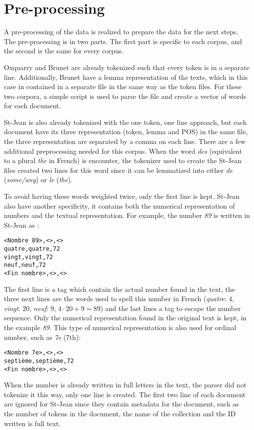 \section{Pre-processing}

A pre-processing of the data is realized to prepare the data for the next steps.
The pre-processing is in two parts.
The first part is specific to each corpus, and the second is the same for every corpus.

Oxquarry and Brunet are already tokenized such that every token is in a separate line.
Additionally, Brunet have a lemma representation of the texts, which in this case in contained in a separate file in the same way as the token files.
For these two corpora, a simple script is used to parse the file and create a vector of words for each document.

St-Jean is also already tokenized with the one token, one line approach, but each document have its three representation (token, lemma and POS) in the same file, the three representation are separated by a comma on each line.
There are a few additional preprocessing needed for this corpus.
When the word \textit{des} (equivalent to a plural \textit{the} in French) is encounter, the tokenizer used to create the St-Jean files created two lines for this word since it can be lemmatized into either \textit{de} (\textit{some/any}) or \textit{le} (\textit{the}).

To avoid having these words weighted twice, only the first line is kept.
St-Jean also have another specificity, it contains both the numerical representation of numbers and the textual representation.
For example, the number \textit{89} is written in St-Jean as :
\begin{verbatim}
<Nombre 89>,<>,<>
quatre,quatre,72
vingt,vingt,72
neuf,neuf,72
<Fin nombre>,<>,<>
\end{verbatim}
The first line is a tag which contain the actual number found in the text, the three next lines are the words used to spell this number in French (\textit{quatre}: $4$, \textit{vingt}: $20$, \textit{neuf}: $9$, $4 \cdot 20 + 9 = 89$) and the last lines a tag to escape the number sequence.
Only the numerical representation found in the original text is kept, in the example \textit{89}.
This type of numerical representation is also used for ordinal number, such as \textit{7e} (7th):
\begin{verbatim}
<Nombre 7e>,<>,<>
septième,septième,72
<Fin nombre>,<>,<>
\end{verbatim}
When the number is already written in full letters in the text, the parser did not tokenize it this way, only one line is created.
The first two line of each document are ignored for St-Jean since they contain metadata for the document, such as the number of tokens in the document, the name of the collection and the ID written is full text.

